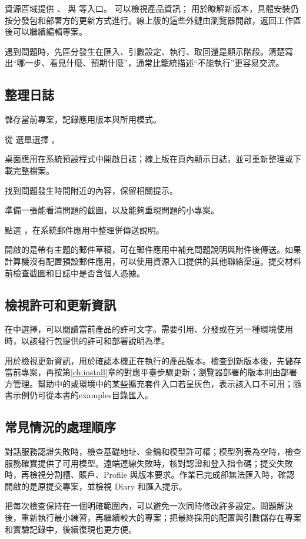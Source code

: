 資源區域提供 、 與  等入口。 可以檢視產品資訊； 用於瞭解新版本，具體安裝仍按分發包和部署方的更新方式進行。線上版的這些外鏈由瀏覽器開啟，返回工作區後可以繼續編輯專案。

遇到問題時，先區分發生在匯入、引數設定、執行、取回還是顯示階段。清楚寫出“哪一步、看見什麼、預期什麼”，通常比籠統描述“不能執行”更容易交流。

\subsection{整理日誌}

\begin{steps}
\item 儲存當前專案，記錄應用版本與所用模式。
\item 從  選單選擇 。
\item 桌面應用在系統預設程式中開啟日誌；線上版在頁內顯示日誌，並可重新整理或下載完整檔案。
\item 找到問題發生時間附近的內容，保留相關提示。
\item 準備一張能看清問題的截圖，以及能夠重現問題的小專案。
\item 點選 ，在系統郵件應用中整理併傳送說明。
\end{steps}

 開啟的是帶有主題的郵件草稿，可在郵件應用中補充問題說明與附件後傳送。如果計算機沒有配置預設郵件應用，可以使用資源入口提供的其他聯絡渠道。提交材料前檢查截圖和日誌中是否含個人憑據。


\subsection{檢視許可和更新資訊}

在中選擇，可以閱讀當前產品的許可文字。需要引用、分發或在另一種環境使用時，以該發行包提供的許可和部署說明為準。

用於檢視更新資訊，用於確認本機正在執行的產品版本。檢查到新版本後，先儲存當前專案，再按第\ref{ch:install}章的對應平臺步驟更新；瀏覽器部署的版本則由部署方管理。幫助中的或環境中的某些擴充套件入口若呈灰色，表示該入口不可用；隨書示例仍可從本書的examples目錄匯入。


\subsection{常見情況的處理順序}

對話服務認證失敗時，檢查基礎地址、金鑰和模型許可權；模型列表為空時，檢查服務確實提供了可用模型。遠端連線失敗時，核對認證和登入指令碼；提交失敗時，再檢視分割槽、賬戶、Profile 與版本要求。作業已完成卻無法匯入時，確認開啟的是原提交專案，並檢視 Diary 和匯入提示。

把每次檢查保持在一個明確範圍內，可以避免一次同時修改許多設定。問題解決後，重新執行最小練習，再繼續較大的專案；把最終採用的配置與引數儲存在專案和實驗記錄中，後續復現也更方便。
